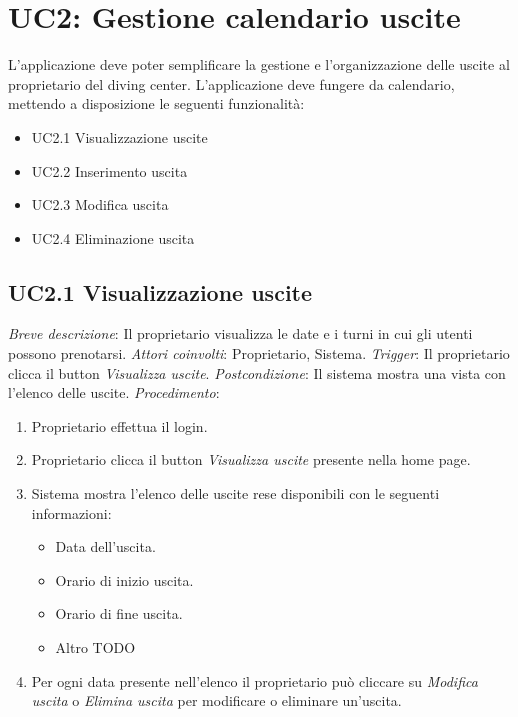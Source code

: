 \section{UC2: Gestione calendario uscite}
L'applicazione deve poter semplificare la gestione e l'organizzazione delle uscite al proprietario del diving center.
L'applicazione deve fungere da calendario, mettendo a disposizione le seguenti funzionalità:

\begin{itemize}
    \item UC2.1 Visualizzazione uscite
    \item UC2.2 Inserimento uscita
    \item UC2.3 Modifica uscita
    \item UC2.4 Eliminazione uscita
\end{itemize}

\subsection{UC2.1 Visualizzazione uscite}

\noindent \emph{Breve descrizione}: Il proprietario visualizza le date e i turni in cui gli utenti possono prenotarsi.\medbreak
\noindent \emph{Attori coinvolti}: Proprietario, Sistema.\medbreak
\noindent \emph{Trigger}: Il proprietario clicca il button \textit{Visualizza uscite}.\medbreak
\noindent \emph{Postcondizione}: Il sistema mostra una vista con l'elenco delle uscite.\medbreak
\noindent \emph{Procedimento}:

\begin{enumerate}
    \item Proprietario effettua il login.
    \item Proprietario clicca il button \textit{Visualizza uscite} presente nella home page.
    \item Sistema mostra l'elenco delle uscite rese disponibili con le seguenti informazioni:
          \begin{itemize}
              \item Data dell'uscita.
              \item Orario di inizio uscita.
              \item Orario di fine uscita.
              \item Altro TODO
          \end{itemize}
    \item Per ogni data presente nell'elenco il proprietario può cliccare su \textit{Modifica uscita} o \textit{Elimina uscita} per modificare o eliminare un'uscita.
\end{enumerate}

